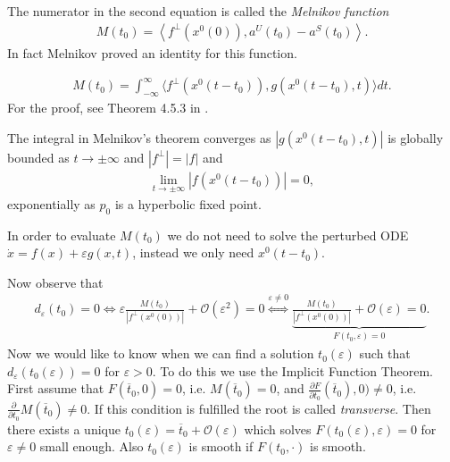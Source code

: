 The numerator in the second equation is called the \emph{Melnikov function}
\begin{align}
	M(t_0)=\left\langle f^{\perp}(x^{0}(0)), a^{U}(t_0) - a^{S}(t_0) \right\rangle	.
\end{align}
In fact Melnikov proved an identity for this function.
\begin{theorem}[Melnikov]
	\begin{align}
		M(t_0) = \int_{-\infty }^{\infty }  \langle f^{\perp}(x^{0}(t-t_0)), g(x^{0}(t-t_0),t)\rangle dt.
	\end{align}
	For the proof, see Theorem 4.5.3 in \cite{GuckenheimerHolmes}.	
\end{theorem}
\begin{remark}[]
	The integral in Melnikov's theorem converges as $|g(x^{0}(t-t_0),t)|$ is globally bounded as $t \to \pm \infty $ and $|f^{\perp}| = |f|$ and
	\begin{align}
		\lim_{t\to \pm \infty }\left| f(x^{0}(t-t_0)) \right| =0,
	\end{align}
	exponentially as $p_0$ is a hyperbolic fixed point.	
\end{remark}

\begin{remark}[]
	In order to evaluate $M(t_0)$ we do not need to solve the perturbed ODE $\dot{x} =f(x) + \varepsilon g(x,t)$, instead we only need $x^{0}(t-t_0)$.
\end{remark}

Now observe that
\begin{align}
	d_{\varepsilon} (t_0) = 0 \iff \varepsilon \frac{M(t_0)}{\left| f^{\perp}(x^{0}(0))\right|} + \mathcal{O}(\varepsilon^2) = 0 \overset{\varepsilon \neq 0}{\iff} \underbrace{\frac{M(t_0)}{\left| f^{\perp}(x^{0}(0)) \right|} + \mathcal{O}(\varepsilon)=0}_{F(t_0, \varepsilon) = 0}.
\end{align}
Now we would like to know when we can find a solution $t_0(\varepsilon)$ such that $d_{\varepsilon}(t_0(\varepsilon))=0$ for $\varepsilon > 0$. To do this we use the Implicit Function Theorem. First assume that $F(\overline{t}_{0}, 0) = 0$, i.e. $M(\overline{t}_0) = 0$, and $\frac{\partial F}{\partial t_0}(\overline{t}_0), 0) \neq 0$, i.e. $\frac{\partial }{\partial t_0}M(\overline{t}_0) \neq 0$. If this condition is fulfilled the root is called \emph{transverse}.  Then there exists a unique $t_0(\varepsilon) = \overline{t}_{0} + \mathcal{O}(\varepsilon)$ which solves $F(t_0(\varepsilon), \varepsilon)=0$ for $\varepsilon \neq 0$ small enough. Also $t_0(\varepsilon)$ is smooth if $F(t_0,\cdot)$ is smooth.

